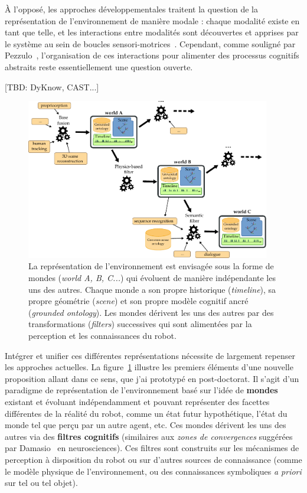 \documentclass[a4paper]{article}
\begin{document}
À l'opposé, les approches développementales traitent la question de la
représentation de l'environnement de manière modale : chaque modalité existe en
tant que telle, et les interactions entre modalités sont découvertes et apprises
par le système au sein de boucles sensori-motrices~\cite{morse2010epigenetic,
mihoub2014modeling}. Cependant, comme souligné
par Pezzulo~\cite{pezzulo2012computational}, l'organisation de ces interactions
pour alimenter des processus cognitifs abstraits reste essentiellement une
question ouverte.

[TBD: DyKnow, CAST...]

\begin{figure}
    \centering
\includegraphics[width=0.95\textwidth]{figs/worlds}
\caption{\small La représentation de l'environnement est envisagée sous la forme
    de mondes (\emph{world A, B, C...}) qui évoluent de manière indépendante les
    uns des autres. Chaque monde a son propre historique (\emph{timeline}), sa
    propre géométrie (\emph{scene}) et son propre modèle cognitif ancré
    (\emph{grounded ontology}).  Les mondes dérivent les uns des autres par des
    transformations (\emph{filters}) successives qui sont alimentées par la
    perception et les connaissances du robot.  }

\label{worlds}
\end{figure}

Intégrer et unifier ces différentes représentations nécessite de largement
repenser les approches actuelles. La figure~\ref{worlds} illustre les premiers
éléments d'une nouvelle proposition allant dans ce sens, que j'ai prototypé en
post-doctorat. Il s'agit d'un paradigme de représentation de l'environnement
basé sur l'idée de \textbf{mondes} existant et évoluant indépendamment et
pouvant représenter des facettes différentes de la réalité du robot, comme un
état futur hypothétique, l'état du monde tel que perçu par un autre agent,
etc. Ces mondes dérivent les uns des autres via des \textbf{filtres cognitifs}
(similaires aux \emph{zones de convergences} suggérées par
Damasio~\cite{damasio1989time} en neurosciences). Ces filtres sont construits
sur les mécanismes de perception à disposition du robot ou sur d'autres sources de
connaissance (comme le modèle physique de l'environnement, ou des connaissances
symboliques \textit{a priori} sur tel ou tel objet).
\end{document}
